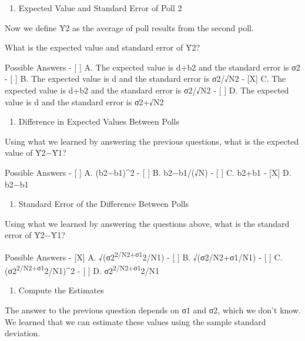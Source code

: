 \documentclass[
]{article}
\providecommand{\tightlist}{%
  \setlength{\itemsep}{0pt}\setlength{\parskip}{0pt}}
\begin{document}
\begin{enumerate}
\def\labelenumi{\arabic{enumi}.}
\setcounter{enumi}{9}
\tightlist
\item
  Expected Value and Standard Error of Poll 2
\end{enumerate}

Now we define Ȳ2 as the average of poll results from the second poll.

What is the expected value and standard error of Ȳ2?

Possible Answers - {[} {]} A. The expected value is d+b2 and the
standard error is σ2 - {[} {]} B. The expected value is d and the
standard error is σ2/√N2 - {[}X{]} C. The expected value is d+b2 and the
standard error is σ2/√N2 - {[} {]} D. The expected value is d and the
standard error is σ2+√N2

\begin{enumerate}
\def\labelenumi{\arabic{enumi}.}
\setcounter{enumi}{10}
\tightlist
\item
  Difference in Expected Values Between Polls
\end{enumerate}

Using what we learned by answering the previous questions, what is the
expected value of Ȳ2−Ȳ1?

Possible Answers - {[} {]} A. (b2−b1)\^{}2 - {[} {]} B. b2−b1/(√N) - {[}
{]} C. b2+b1 - {[}X{]} D. b2−b1

\begin{enumerate}
\def\labelenumi{\arabic{enumi}.}
\setcounter{enumi}{11}
\tightlist
\item
  Standard Error of the Difference Between Polls
\end{enumerate}

Using what we learned by answering the questions above, what is the
standard error of Ȳ2−Ȳ1?

Possible Answers - {[}X{]} A. √(σ2\textsuperscript{2/N2+σ1}2/N1) - {[}
{]} B. √(σ2/N2+σ1/N1) - {[} {]} C.
(σ2\textsuperscript{2/N2+σ1}2/N1)\^{}2 - {[} {]} D.
σ2\textsuperscript{2/N2+σ1}2/N1

\begin{enumerate}
\def\labelenumi{\arabic{enumi}.}
\setcounter{enumi}{12}
\tightlist
\item
  Compute the Estimates
\end{enumerate}

The answer to the previous question depends on σ1 and σ2, which we don't
know. We learned that we can estimate these values using the sample
standard deviation.
\end{document}
